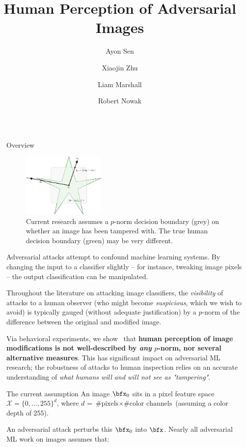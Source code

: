 \documentclass[final,notheorems]{beamer}
\title{Human Perception of Adversarial Images}
\author{Ayon Sen \inst{1} \and Xiaojin Zhu \inst{1} \and Liam Marshall \inst{1} \and Robert Nowak \inst{1}}
\institute[shortinst]{\inst{1} University of Wisconsin-Madison}
\newlength{\sepwidth}
\newlength{\colwidth}
\newcommand{\separatorcolumn}{\begin{column}{\sepwidth}\end{column}}
\def\X{\mathcal X}
\begin{document}
\begin{frame}[t]
\begin{columns}[t]
\separatorcolumn

\begin{column}{\colwidth}
  \begin{block}{Overview}
    \begin{figure}
      \centering
      \includegraphics[width=0.38\textwidth]{fig/intro_image-figure0.eps}
      \caption{Current research assumes a $p$-norm decision boundary (grey) on whether an image has been tampered with. The true human decision boundary (green) may be very different.}
      \label{fig:decision_boundary}
    \end{figure}
    Adversarial attacks attempt to confound machine learning systems. By changing the input to a classifier slightly -- for instance, tweaking image pixels -- the output classification can be manipulated.

    Throughout the literature on attacking image classifiers, the \emph{visibility} of attacks to a human observer (who might become \emph{suspicious}, which we wish to avoid) is typically gauged (without adequate justification) by a $p$-norm of the difference between the original and modified image.

    Via behavioral experiments, we show~\cite{sen2019perception} that \textbf{human perception of image modifications is not well-described by \emph{any} $p$-norm, nor several alternative measures}.
    This has significant impact on adversarial ML research; the robustness of attacks to human inspection relies on an accurate understanding of \emph{what humans will and will not see as "tampering"}.

  \end{block}

  \begin{alertblock}{The current assumption}
    An image $\bfx_0$ sits in a pixel feature space $\X = \{0,\ldots,255\}^d$, where $d$ = $\text{\# pixels} \times \text{\# color channels}$ (assuming a color depth of 255).

    An adversarial attack perturbs this $\bfx_0$ into $\bfx$. Nearly all adversarial ML work on images assumes that:


\end{alertblock}
\end{column}
\end{columns}
\end{frame}
\end{document}
